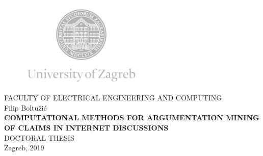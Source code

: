 \documentclass[12pt,oneside, a4paper]{book}
\begin{document}
\frontmatter

\begin{titlepage}
  \fontsize{16pt}{20pt}\selectfont
  \selectfont
  \setlength{\intextsep}{0pt plus 0pt minus 0pt}

  \begin{center}
    \begin{figure}[ht!]
      \begin{center}
        \includegraphics[height=4.1184cm, width=5.94cm]{logo_unizg_eng}
      \end{center}
    \end{figure}
    \vspace{0cm}
    {FACULTY OF ELECTRICAL ENGINEERING AND COMPUTING} \\
    \vspace{3cm}
    Filip Boltužić \\
    \vspace{2cm}
    {\fontsize{22pt}{22pt}\selectfont
\textbf{
COMPUTATIONAL METHODS FOR ARGUMENTATION MINING OF CLAIMS IN INTERNET DISCUSSIONS}} \\
    \vspace{2cm}  
    DOCTORAL THESIS \\    
    \vfill{Zagreb, 2019}
  \end{center}
  \restoregeometry
\end{titlepage}
\end{document}

